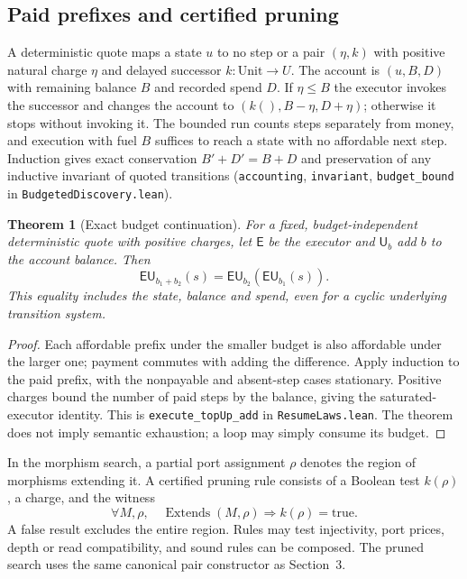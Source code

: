 \documentclass[10pt,letterpaper]{article}
\newtheorem{theorem}{Theorem}[section]
\newcommand{\rc}[1]{\texttt{#1}}
\begin{document}
\subsection{Paid prefixes and certified pruning}
A deterministic quote maps a state $u$ to no step or a pair $(\eta, k)$ with positive natural charge $\eta$ and delayed successor $k:\mathrm{Unit}\to U$. The account is $(u,B,D)$ with remaining balance $B$ and recorded spend $D$. If $\eta\le B$ the executor invokes the successor and changes the account to $(k(),B-\eta,D+\eta)$; otherwise it stops without invoking it. The bounded run counts steps separately from money, and execution with fuel $B$ suffices to reach a state with no affordable next step. Induction gives exact conservation $B'+D'=B+D$ and preservation of any inductive invariant of quoted transitions (\rc{accounting}, \rc{invariant}, \rc{budget\_bound} in \rc{BudgetedDiscovery.lean}).

\begin{theorem}[Exact budget continuation]\label{thm:resume}
For a fixed, budget-independent deterministic quote with positive charges, let $\mathsf E$ be the executor and $\mathsf U_b$ add $b$ to the account balance. Then
\[
 \mathsf E\mathsf U_{b_1+b_2}(s)=\mathsf E\mathsf U_{b_2}(\mathsf E\mathsf U_{b_1}(s)).
\]
This equality includes the state, balance and spend, even for a cyclic underlying transition system.
\end{theorem}
\begin{proof}
Each affordable prefix under the smaller budget is also affordable under the larger one; payment commutes with adding the difference. Apply induction to the paid prefix, with the nonpayable and absent-step cases stationary. Positive charges bound the number of paid steps by the balance, giving the saturated-executor identity. This is \rc{execute\_topUp\_add} in \rc{ResumeLaws.lean}. The theorem does not imply semantic exhaustion; a loop may simply consume its budget.
\end{proof}
In the morphism search, a partial port assignment $\rho$ denotes the region of morphisms extending it. A certified pruning rule consists of a Boolean test $k(\rho)$, a charge, and the witness
\[
 \forall M,\rho,\quad \operatorname{Extends}(M,\rho)\Longrightarrow k(\rho)=\mathrm{true}.
\]
A false result excludes the entire region. Rules may test injectivity, port prices, depth or read compatibility, and sound rules can be composed. The pruned search uses the same canonical pair constructor as Section~3.
\end{document}
